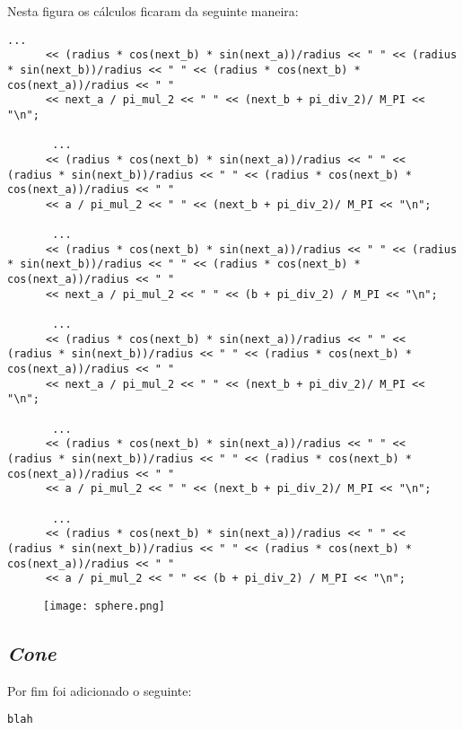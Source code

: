 \documentclass[11pt,a4paper]{report}
\begin{document}
Nesta figura os cálculos ficaram da seguinte maneira:
\begin{multicols}{2}
\begin{lstlisting}[style = code]
       ...	
      << (radius * cos(next_b) * sin(next_a))/radius << " " << (radius * sin(next_b))/radius << " " << (radius * cos(next_b) * cos(next_a))/radius << " "
      << next_a / pi_mul_2 << " " << (next_b + pi_div_2)/ M_PI << "\n";
			
       ...
      << (radius * cos(next_b) * sin(next_a))/radius << " " <<  (radius * sin(next_b))/radius << " " << (radius * cos(next_b) * cos(next_a))/radius << " "
      << a / pi_mul_2 << " " << (next_b + pi_div_2)/ M_PI << "\n";

       ...
      << (radius * cos(next_b) * sin(next_a))/radius << " " << (radius * sin(next_b))/radius << " " << (radius * cos(next_b) * cos(next_a))/radius << " "
      << next_a / pi_mul_2 << " " << (b + pi_div_2) / M_PI << "\n";

       ...
      << (radius * cos(next_b) * sin(next_a))/radius << " " <<  (radius * sin(next_b))/radius << " " << (radius * cos(next_b) * cos(next_a))/radius << " "
      << next_a / pi_mul_2 << " " << (next_b + pi_div_2)/ M_PI << "\n";

       ...
      << (radius * cos(next_b) * sin(next_a))/radius << " " <<  (radius * sin(next_b))/radius << " " << (radius * cos(next_b) * cos(next_a))/radius << " "
      << a / pi_mul_2 << " " << (next_b + pi_div_2)/ M_PI << "\n";

       ...
      << (radius * cos(next_b) * sin(next_a))/radius << " " <<  (radius * sin(next_b))/radius << " " << (radius * cos(next_b) * cos(next_a))/radius << " "
      << a / pi_mul_2 << " " << (b + pi_div_2) / M_PI << "\n";
\end{lstlisting}
\end{multicols}
\begin{figure}[h]
    \centering
    \texttt{[image: sphere.png]}
\end{figure}
\newpage
\subsection{\emph{Cone}}
Por fim foi adicionado o seguinte:
\begin{multicols}{2}
\begin{lstlisting}[style = code]
blah
\end{lstlisting}
\end{multicols}
\end{document}
